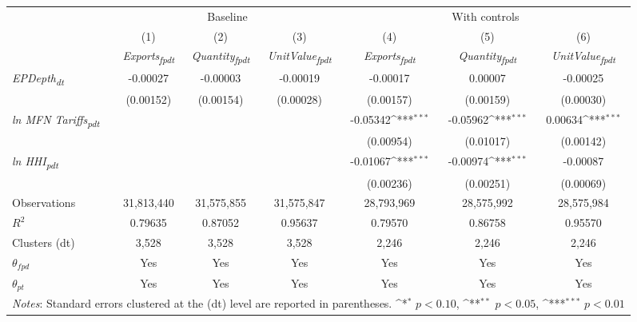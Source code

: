 {
\def\sym#1{\ifmmode^{#1}\else\(^{#1}\)\fi}
\begin{tabular}{l*{6}{c}}
\toprule
&\multicolumn{3}{c}{Baseline}&\multicolumn{3}{c}{With controls}\\\cmidrule(lr){2-4}\cmidrule(lr){5-7}
&(1)&(2)&(3)&(4)&(5)&(6)\\
&\textit{Exports\textsubscript{fpdt}}&\textit{Quantity\textsubscript{fpdt}}&\textit{UnitValue\textsubscript{fpdt}}&\textit{Exports\textsubscript{fpdt}}&\textit{Quantity\textsubscript{fpdt}}&\textit{UnitValue\textsubscript{fpdt}}\\
\midrule
\textit{EPDepth\textsubscript{dt}} & -0.00027 & -0.00003 & -0.00019 & -0.00017 & 0.00007 & -0.00025\\
 & (0.00152) & (0.00154) & (0.00028) & (0.00157) & (0.00159) & (0.00030)\\
\addlinespace
\textit{ln MFN Tariffs\textsubscript{pdt}} &  &  &  & -0.05342\sym{***} & -0.05962\sym{***} & 0.00634\sym{***}\\
 &  &  &  & (0.00954) & (0.01017) & (0.00142)\\
\addlinespace
\textit{ln HHI\textsubscript{pdt}} &  &  &  & -0.01067\sym{***} & -0.00974\sym{***} & -0.00087\\
 &  &  &  & (0.00236) & (0.00251) & (0.00069)\\
\midrule
Observations & 31,813,440 & 31,575,855 & 31,575,847 & 28,793,969 & 28,575,992 & 28,575,984\\
$R^{2}$ & 0.79635 & 0.87052 & 0.95637 & 0.79570 & 0.86758 & 0.95570\\
Clusters (dt) & 3,528 & 3,528 & 3,528 & 2,246 & 2,246 & 2,246\\
$\theta_{fpd}$ & Yes & Yes & Yes & Yes & Yes & Yes\\
$\theta_{pt}$ & Yes & Yes & Yes & Yes & Yes & Yes\\
\bottomrule
\multicolumn{7}{l}{\footnotesize \textit{Notes}: Standard errors clustered at the (dt) level are reported in parentheses. \sym{*} \(p<0.10\), \sym{**} \(p<0.05\), \sym{***} \(p<0.01\)}\\
\end{tabular}
}
